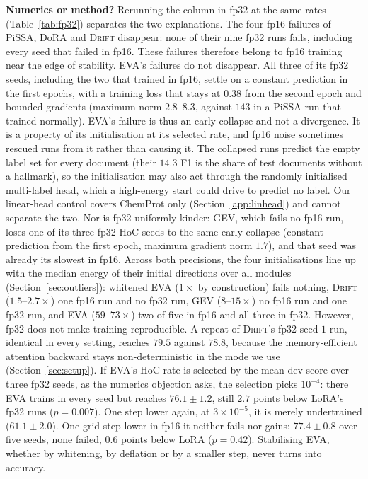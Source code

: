 \documentclass[conference,onecolumn]{IEEEtran}
\newcommand{\method}{\textsc{Drift}}
\begin{document}
\noindent\textbf{Numerics or method?} Rerunning the column in fp32 at the same
rates (Table~\ref{tab:fp32}) separates the two explanations. The four fp16
failures of PiSSA, DoRA and \method{} disappear: none of their nine fp32 runs
fails, including every seed that failed in fp16. These failures therefore belong
to fp16 training near the edge of stability. EVA's failures do not disappear.
All three of its fp32 seeds, including the two that trained in fp16, settle on a
constant
prediction in the first epochs, with a training loss that stays at $0.38$ from
the second epoch and bounded gradients (maximum norm $2.8$--$8.3$, against $143$
in a PiSSA run that trained normally). EVA's failure is thus an early collapse
and not a divergence. It is a property of its initialisation at its selected
rate, and fp16 noise sometimes rescued runs from it rather than causing it. The
collapsed runs predict the empty label set for every document (their $14.3$ F1
is the share of test documents without a hallmark), so the initialisation may
also act through the randomly initialised multi-label head, which a high-energy
start could drive to predict no label. Our linear-head control covers ChemProt
only (Section~\ref{app:linhead}) and cannot separate the two. Nor
is fp32 uniformly kinder: GEV, which fails no fp16 run, loses one of its three
fp32 HoC seeds to the same early collapse (constant prediction from the first
epoch, maximum gradient norm $1.7$), and that seed was already its slowest in
fp16. Across both precisions, the four initialisations line up with the median
energy of their initial directions over all modules (Section~\ref{sec:outliers}):
whitened EVA ($1\times$ by
construction) fails nothing, \method{} ($1.5$--$2.7\times$) one fp16 run and no
fp32 run, GEV ($8$--$15\times$) no fp16 run and one fp32 run, and EVA
($59$--$73\times$) two of five in fp16 and all three in fp32. However, fp32 does
not make training reproducible. A repeat of \method{}'s fp32 seed-$1$ run,
identical in every setting, reaches $79.5$ against $78.8$, because the
memory-efficient attention backward stays non-deterministic in the mode we use
(Section~\ref{sec:setup}). If EVA's HoC rate is selected by the mean dev score
over three fp32 seeds, as the numerics objection asks, the selection
picks $10^{-4}$: there EVA trains in every seed but reaches $76.1\pm1.2$, still
$2.7$ points below LoRA's fp32 runs ($p = 0.007$). One step lower again, at
$3\times10^{-5}$, it is merely undertrained ($61.1\pm2.0$). One grid step lower
in fp16 it neither fails nor gains: $77.4\pm0.8$ over five seeds, none failed,
$0.6$ points below LoRA ($p = 0.42$). Stabilising EVA, whether by whitening, by
deflation or by a smaller step, never turns into accuracy.
\end{document}
